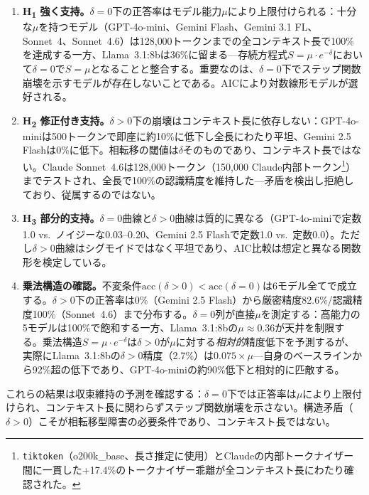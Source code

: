 \documentclass[11pt,a4paper]{article}
\begin{document}
\begin{enumerate}
  \item \textbf{H\textsubscript{1} 強く支持。}$\delta = 0$下の正答率はモデル能力$\mu$により上限付けられる：十分な$\mu$を持つモデル（GPT-4o-mini、Gemini Flash、Gemini 3.1 FL、Sonnet~4、Sonnet~4.6）は128{,}000トークンまでの全コンテキスト長で100\%を達成する一方、Llama~3.1:8bは36\%に留まる---存続方程式$S = \mu \cdot e^{-\delta}$において$\delta = 0$で$S = \mu$となることと整合する。重要なのは、$\delta = 0$下でステップ関数崩壊を示すモデルが存在しないことである。AICにより対数線形モデルが選好される。

  \item \textbf{H\textsubscript{2} 修正付き支持。}$\delta > 0$下の崩壊はコンテキスト長に依存しない：GPT-4o-miniは500トークンで即座に約10\%に低下し全長にわたり平坦、Gemini 2.5 Flashは0\%に低下。相転移の閾値は$\delta$そのものであり、コンテキスト長ではない。Claude Sonnet~4.6は128{,}000トークン（150{,}000 Claude内部トークン\footnote{\texttt{tiktoken}（o200k\_base、長さ推定に使用）とClaudeの内部トークナイザー間に一貫した+17.4\%のトークナイザー乖離が全コンテキスト長にわたり確認された。}）までテストされ、全長で100\%の認識精度を維持した---矛盾を検出し拒絶しており、従属するのではない。

  \item \textbf{H\textsubscript{3} 部分的支持。}$\delta = 0$曲線と$\delta > 0$曲線は質的に異なる（GPT-4o-miniで定数1.0 vs.\ ノイジーな0.03--0.20、Gemini 2.5 Flashで定数1.0 vs.\ 定数0.0）。ただし$\delta > 0$曲線はシグモイドではなく平坦であり、AIC比較は想定と異なる関数形を検定している。

  \item \textbf{乗法構造の確認。}不変条件$\text{acc}(\delta > 0) < \text{acc}(\delta = 0)$は6モデル全てで成立する。$\delta > 0$下の正答率は0\%（Gemini 2.5 Flash）から厳密精度82.6\%/認識精度100\%（Sonnet~4.6）まで分布する。$\delta = 0$列が直接$\mu$を測定する：高能力の5モデルは100\%で飽和する一方、Llama~3.1:8bの$\mu \approx 0.36$が天井を制限する。乗法構造$S = \mu \cdot e^{-\delta}$は$\delta > 0$が$\mu$に対する\emph{相対的}精度低下を予測するが、実際にLlama~3.1:8bの$\delta > 0$精度（2.7\%）は$0.075 \times \mu$---自身のベースラインから92\%超の低下であり、GPT-4o-miniの約90\%低下と相対的に匹敵する。
\end{enumerate}

\noindent これらの結果は収束維持の予測を確認する：$\delta = 0$下では正答率は$\mu$により上限付けられ、コンテキスト長に関わらずステップ関数崩壊を示さない。構造矛盾（$\delta > 0$）こそが相転移型障害の必要条件であり、コンテキスト長ではない。
\end{document}
